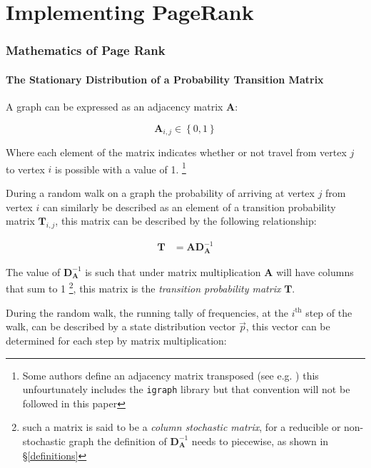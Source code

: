\documentclass[11pt]{report}
\begin{document}
\part{Implementing PageRank}
\section{Mathematics of Page Rank}
\label{PageRank-Generally}
\subsection{The Stationary Distribution of a Probability Transition Matrix}
\label{stationary-distribution-of-t}
A graph can be expressed as an adjacency matrix \(\mathbf{A}\):

\[
\mathbf{A}_{i,j} \in \left\{ 0,1 \right\}
\]

Where each element of the matrix indicates whether or not travel from
vertex \(j\) to vertex \(i\) is possible with a value of 1. \footnote{Some
authors define an adjacency matrix transposed (see e.g.
\cite{rosenDiscreteMathematicsIts2007,meghabghabSearchEnginesLink2008})
this unfourtunately includes the \texttt{igraph} library
\cite{gaborcsardiIgraphManualPages2019} but that convention will not be
followed in this paper}

During a random walk on a graph the probability of arriving at vertex \(j\) from vertex
\(i\) can similarly be described as an element of a transition probability
matrix \(\mathbf{T}_{i,j}\), this matrix can be described by the following
relationship:

\begin{align}
\mathbf{T} &= \mathbf{A} \mathbf{D}^{-1}_{\mathbf{A}} \label{eq:basic-trans-def}
\end{align}

The value of \(\mathbf{D}^{-1}_{\mathbf{A}}\) is such that under matrix
multiplication \(\mathbf{A}\) will have columns that sum to 1 \footnote{such a matrix is said to be a \emph{column stochastic
matrix}, for a
reducible or non-stochastic graph the definition of
\(\mathbf{D}^{-1}_{\mathbf{A}}\) needs to piecewise, as shown in \S \ref{definitions}}, this matrix is the \emph{transition probability
matrix} \(\mathbf{T}\).

During the random walk, the running tally of frequencies, at the
\(i^{\mathrm{th}}\) step of the walk, can be described by a state distribution
vector \(\vec{p}\), this vector can be determined for each step by matrix
multiplication:
\end{document}
